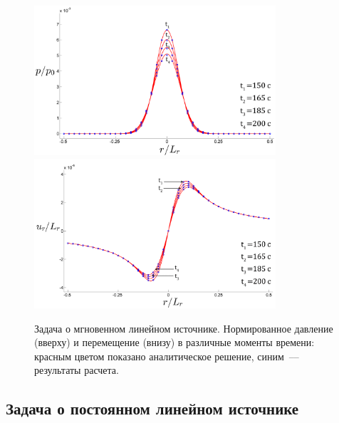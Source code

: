 \begin{figure}[t!]
\centering
  \includegraphics[width=0.8\textwidth]{figs/press_line_mom2.png}\\
  \includegraphics[width=0.8\textwidth]{figs/disp_line_mom2.png}
  \caption{ Задача о мгновенном линейном источнике. Нормированное давление (вверху) и перемещение (внизу) в различные моменты времени: красным
цветом показано аналитическое решение, синим~--– результаты расчета.}
  \label{fig::press_line_mom}
\end{figure}


\subsection{Задача о постоянном линейном источнике}

